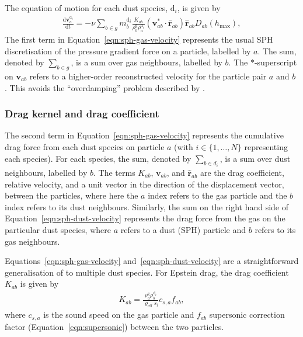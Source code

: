 \documentclass[fleqn,usenatbib]{mnras}
\newcommand{\g}{\mathrm{g}}
\newcommand{\dd}{\mathrm{d}}
\let\vec\bm
\begin{document}
The equation of motion for each dust species, \(\dd_i\), is given by
%
\begin{align}
   \label{eqn:sph-dust-velocity}
   \frac{\dd \vec{v}^{\dd_i}_a}{\dd t} =
      - \nu \sum_{b \in g} m^{\dd_i}_b \frac{K_{ab}}{\rho^{\g}_b \rho^{\dd_i}_a}
      (\vec{v}^{*}_{ab} \cdot \hat{\vec{r}}_{ab}) \hat{\vec{r}}_{ab} D_{ab}(h_{\max}),
\end{align}
%
The first term in Equation~\ref{eqn:sph-gas-velocity} represents the usual SPH
discretisation of the pressure gradient force on a particle, labelled by \(a\).
The sum, denoted by \(\sum_{b \in g}\), is a sum over gas neighbours, labelled
by \(b\). The \(*\)-superscript on \(\vec{v}_{ab}\) refers to a higher-order
reconstructed velocity for the particle pair \(a\) and \(b\)
\citep{Price2020MNRAS.495.3929P}. This avoids the ``overdamping'' problem
described by \citet{Laibe2012MNRAS.420.2345L}.


\subsubsection{Drag kernel and drag coefficient}

The second term in Equation~\ref{eqn:sph-gas-velocity} represents the cumulative
drag force from each dust species on particle \(a\) (with \(i \in \{1, \ldots,
N\}\) representing each species). For each species, the sum, denoted by
\(\sum_{b \in d_i}\), is a sum over dust neighbours, labelled by \(b\). The
terms \(K_{ab}\), \(\vec{v}_{ab}\), and \(\hat{\vec{r}}_{ab}\) are the drag
coefficient, relative velocity, and a unit vector in the direction of the
displacement vector, between the particles, where here the \(a\) index refers to
the gas particle and the \(b\) index refers to its dust neighbours. Similarly,
the sum on the right hand side of Equation~\ref{eqn:sph-dust-velocity}
represents the drag force from the gas on the particular dust species, where
\(a\) refers to a dust (SPH) particle and \(b\) refers to its gas neighbours.

Equations~\ref{eqn:sph-gas-velocity} and~\ref{eqn:sph-dust-velocity} are a
straightforward generalisation of \citet{Laibe2012MNRAS.420.2345L} to multiple
dust species. For Epstein drag, the drag coefficient \(K_{ab}\) is given by
%
\begin{align}
   K_{ab} = \frac{\rho^{\g}_a \rho^{\dd_i}_b}{\varrho_{\mathrm{eff}} s_i} c_{s,a} f_{ab},
\end{align}
%
where \(c_{s,a}\) is the sound speed on the gas particle and \(f_{ab}\)
supersonic correction factor (Equation~\ref{eqn:supersonic}) between the two
particles.
\end{document}
